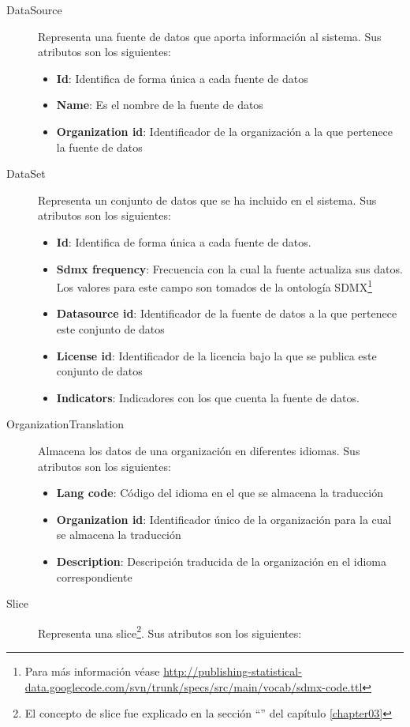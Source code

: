 \begin{description}
\begin{itemize}
		\end{itemize}
	\item[DataSource]  Representa una fuente de datos que aporta información al sistema.  Sus atributos son los siguientes:
		\begin{itemize}
			\item \textbf{Id}:  Identifica de forma única a cada fuente de datos
			\item \textbf{Name}:  Es el nombre de la fuente de datos
			\item \textbf{Organization id}:  Identificador de la organización a la que pertenece la fuente de datos
		\end{itemize}
	\item[DataSet]  Representa un conjunto de datos que se ha incluido en el sistema.  Sus atributos son los siguientes:
		\begin{itemize}
			\item \textbf{Id}:  Identifica de forma única a cada fuente de datos.
			\item \textbf{Sdmx frequency}:  Frecuencia con la cual la fuente actualiza sus datos.  Los valores para este campo son tomados de la ontología SDMX\footnote{Para más información véase \url{http://publishing-statistical-data.googlecode.com/svn/trunk/specs/src/main/vocab/sdmx-code.ttl}}
			\item \textbf{Datasource id}:  Identificador de la fuente de datos a la que pertenece este conjunto de datos
			\item \textbf{License id}:  Identificador de la licencia bajo la que se publica este conjunto de datos
			\item \textbf{Indicators}: Indicadores con los que cuenta la fuente de datos.
		\end{itemize}
	\item[OrganizationTranslation]  Almacena los datos de una organización en diferentes idiomas.  Sus atributos son los siguientes:
		\begin{itemize}
			\item \textbf{Lang code}:  Código del idioma en el que se almacena la traducción
			\item \textbf{Organization id}:  Identificador único de la organización para la cual se almacena la traducción
			\item \textbf{Description}:  Descripción traducida de la organización en el idioma correspondiente
		\end{itemize}
	\item[Slice]  Representa una slice\footnote{El concepto de slice fue explicado en la sección ``'' del capítulo \ref{chapter03}}.  Sus atributos son los siguientes:

\end{description}
